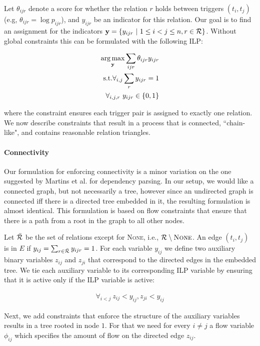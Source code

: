 Let $\theta_{ijr}$ denote a score for whether the relation $r$ holds between triggers $(t_i,t_j)$ (e.g, $\theta_{ijr}=\log p_{ijr}$), and $y_{ijr}$ be an indicator for this relation. Our goal is to find an assignment for the indicators $\mathbf{y}=\{y_{ijr} \ | \ 1 \leq i < j \leq n, r \in \mathcal{R} \}$. Without global constraints this can be formulated with the following ILP:

\begin{align}
\operatorname*{arg\,max}_{\mathbf{y}} \sum_{ijr} \theta_{ijr} y_{ijr} \\
\mbox{s.t.} \forall_{i,j} \sum_r y_{ijr}=1 \nonumber \\
\forall_{i,j,r} \ y_{ijr} \in \{0,1\} \nonumber
\end{align}

\noindent where the constraint ensures each trigger pair is assigned to exactly one relation. We now describe constraints that result in a process that is connected, ``chain-like", and contains reasonable relation triangles.

\paragraph{Connectivity} Our formulation for enforcing connectivity is a minor variation on the one suggested by Martins et al.  for dependency parsing. In our setup, we would like a connected graph, but not necessarily a tree, however since an undirected graph is connected iff there is a directed tree embedded in it, the resulting formulation is almost identical. This formulation is based on flow constraints that ensure that there is a path from a root in the graph to all other nodes.

 Let $\bar{\mathcal{R}}$ be the set of relations except for \textsc{None}, i.e., $\mathcal{R} \setminus \mbox{\textsc{None}}$. An edge $(t_i,t_j)$ is in $E$ if $y_{ij}=\sum_{r \in \bar{\mathcal{R}}} y_{ijr}=1$. For each variable $y_{ij}$ we define two auxiliary binary variables $z_{ij}$ and $z_{ji}$ that correspond to the directed edges in the embedded tree. We tie each auxiliary variable to its corresponding ILP variable by ensuring that it is active only if the ILP variable is active:
 
\begin{align}
\forall_{i<j} \ z_{ij}<y_{ij}, z_{ji} < y_{ij}
\end{align}

Next, we add constraints that enforce the structure of the auxiliary variables results in a tree rooted in node $1$. For that we need for every $i \neq j$ a flow variable $\phi_{ij}$ which specifies the amount of flow on the directed edge $z_{ij}$.

